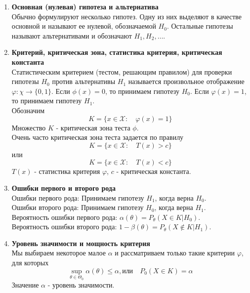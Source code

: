 \documentclass[A4]{article}
\begin{document}
\begin{enumerate}
\begin{enumerate}
		\item \textbf{Основная (нулевая) гипотеза и альтернатива}\\
		Обычно формулируют несколько гипотез. Одну из них выделяют в качестве основной и называют ее нулевой, обозначаемой $H_0$. Остальные гипотезы называют альтернативами и обозначают $H_1,H_2,\ldots$.
		\item \textbf{Критерий, критическая зона, статистика критерия, критическая константа}\\
		Статистическим критерием (тестом, решающим правилом) для проверки гипотезы $H_0$ против альтернативы $H_1$ называется произвольное отображение $\varphi:\chi\rightarrow\{0,1\}$. Если $\phi(x)=0$, то принимаем гипотезу $H_0$. Если $\varphi(x)=1$, то принимаем гипотезу $H_1$.\\
		Обозначим
		\begin{equation}
		K=\{x\in\mathcal{X}:\quad \varphi(x)=1\}
		\end{equation} 
		Множество $K$ - критическая зона теста $\phi$.\\
		Очень часто критическая  зона теста задается по правилу
		\begin{equation}
		K=\{x\in\mathcal{X}:\quad T(x)>c\}
		\end{equation}
		или
		\begin{equation}
		K=\{x\in\mathcal{X}:\quad T(x)<c\}
		\end{equation}
		$T(x)$ - статистика критерия $\varphi$, $c$ - критическая константа.
		\item \textbf{Ошибки первого и второго рода}\\
		Ошибки первого рода: Принимаем гипотезу $H_1$, когда верна $H_0$.\\
		Ошибки второго рода: Принимаем гипотезу $H_0$, когда верна $H_1$.\\
		Вероятность ошибки первого рода: $\alpha(\theta)=P_{\theta}(X\in K|H_0)$.\\
		Вероятность ошибки второго рода: $1-\beta(\theta)=P_{\theta}(X\notin K|H_1)$.\\
		\item \textbf{Уровень значимости и мощность критерия}\\
		Мы выбираем некоторое малое $\alpha$ и рассматриваем только такие критерии $\varphi$, для которых
		\begin{equation}
		\sup_{\theta\in\Theta_0} \alpha(\theta)\le\alpha, \text{или} \quad P_0(X\in K)=\alpha
		\end{equation}
		Значение $\alpha$ - уровень значимости.\\

\end{enumerate}
\end{enumerate}
\end{document}
